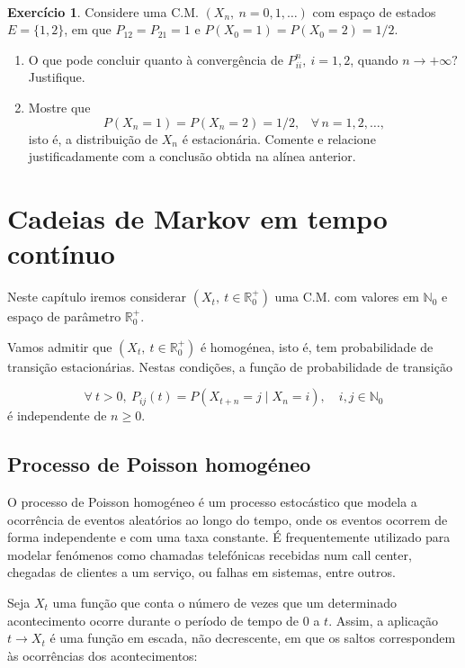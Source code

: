 \documentclass[
  11pt,
  a4paper,
]{book}
\theoremstyle{definition}
\theoremstyle{definition}
\theoremstyle{definition}
\newtheorem{exercise}{Exercício}[chapter]
\theoremstyle{definition}
\theoremstyle{remark}
\begin{document}
\(\,\)

\begin{exercise}
\leavevmode

Considere uma C.M. \((X_{n}, ~n=0,1,\dots)\) com espaço de estados \(E=\{1,2\}\), em que \(P_{12}=P_{21}=1\) e \(P(X_{0}=1)=P(X_{0}=2)=1/2\).

\begin{enumerate}
\def\labelenumi{(\alph{enumi})}
\item
  O que pode concluir quanto à convergência de \(P_{ii}^{n}, ~i=1,2\), quando \(n \to +\infty?\) Justifique.
\item
  Mostre que
  \[
  P(X_{n}=1)=P(X_{n}=2)=1/2,\;\;\;\forall \,n=1,2,\dots,
  \]
  isto é, a distribuição de \(X_{n}\) é estacionária. Comente e
  relacione justificadamente com a conclusão obtida na alínea
  anterior.
\end{enumerate}

\end{exercise}

\chapter{Cadeias de Markov em tempo contínuo}\label{cadeias-de-markov-em-tempo-contuxednuo}

Neste capítulo iremos considerar \((X_t, ~ t \in \mathbb{R}_0^+)\) uma C.M. com valores em \(\mathbb{N}_0\) e espaço de parâmetro \(\mathbb{R}_0^+\).

Vamos admitir que \((X_t, ~ t \in \mathbb{R}_0^+)\) é homogénea, isto é, tem probabilidade de transição estacionárias. Nestas condições, a função de probabilidade de transição

\[\forall ~t >0, ~P_{ij}(t)=P(X_{t+n}=j \mid X_n=i), \quad i,j \in \mathbb{N}_0\]
é independente de \(n \geq 0\).

\section{Processo de Poisson homogéneo}\label{processo-de-poisson-homoguxe9neo}

O processo de Poisson homogéneo é um processo estocástico que modela a ocorrência de eventos aleatórios ao longo do tempo, onde os eventos ocorrem de forma independente e com uma taxa constante. É frequentemente utilizado para modelar fenómenos como chamadas telefónicas recebidas num call center, chegadas de clientes a um serviço, ou falhas em sistemas, entre outros.

Seja \(X_t\) uma função que conta o número de vezes que um determinado acontecimento ocorre durante o período de tempo de 0 a \(t\). Assim, a aplicação \(t \longrightarrow X_t\) é uma função em escada, não decrescente, em que os saltos correspondem às ocorrências dos acontecimentos:
\end{document}
